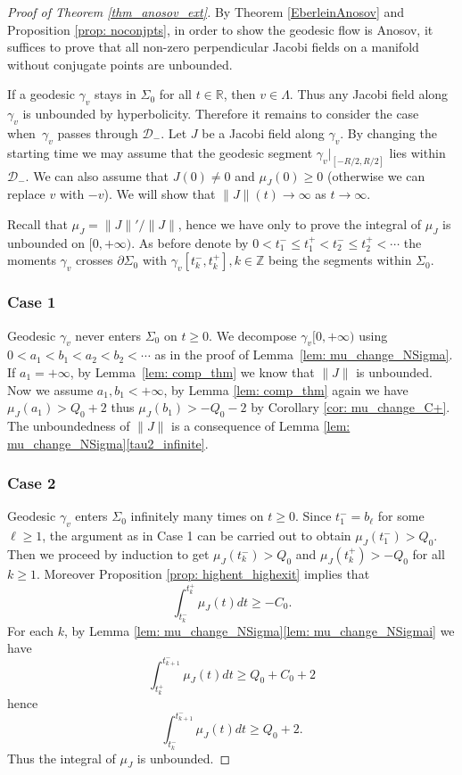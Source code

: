 \documentclass[JEP,XML,SOM,Unicode,NoFloatCountersInSection]{cedram}
\theoremstyle{definition}
\renewcommand{\>}{{\rangle}}
\newcommand{\<}{{\langle}}
\begin{document}
\begin{proof}[Proof of Theorem \ref{thm_anosov_ext}]

By Theorem \ref{EberleinAnosov} and Proposition \ref{prop: noconjpts}, in order to show the geodesic flow is Anosov, it suffices to prove that all non-zero perpendicular Jacobi fields on a manifold without conjugate points are unbounded.

If a geodesic $\gamma_v$ stays in $\Sigma_0$ for all $t\in\mathbb{R}$, then $v\in\Lambda$. Thus any Jacobi field along~$\gamma_v$ is unbounded by hyperbolicity. Therefore it remains to consider the case when~$\gamma_v$ passes through $\mathcal{D}_-$. Let $J$ be a Jacobi field along $\gamma_v$. By changing the starting time we may assume that the geodesic segment $\gamma_v|_{[-R/2,R/2]}$ lies within $\mathcal{D}_-$. We can also assume that $J(0)\neq 0$ and $\mu_J(0)\geq 0$ (otherwise we can replace $v$ with $-v$). We will show that $\|J\|(t)\to\infty$ as $t\to\infty$.

Recall that $\mu_J=\|J\|'/\|J\|$, hence we have only to prove the integral of $\mu_J$ is unbounded on $[0,+\infty)$.
As before denote by $0<t^-_1\leq t^+_1<t^-_2\leq t^+_2<\cdots$ the moments $\gamma_v$ crosses $\partial\Sigma_0$ with $\gamma_v[t^-_k, t^+_k], k\in\mathbb{Z}$ being the segments within $\Sigma_0$.

\subsubsection*{Case 1} Geodesic $\gamma_v$ never enters $\Sigma_0$ on $t\geq 0$. We decompose $\gamma_v[0,+\infty)$ using $0<a_1<b_1<a_2<b_2<\cdots$ as in the proof of Lemma~\ref{lem: mu_change_NSigma}. If $a_1=+\infty$, by Lemma~\ref{lem: comp_thm} we know that $\|J\|$ is unbounded. Now we assume $a_1,b_1<+\infty$, by Lemma \ref{lem: comp_thm} again we have $\mu_J(a_1)>Q_0+2$ thus $\mu_J(b_1)>-Q_0-2$ by Corollary \ref{cor: mu_change_C+}. The unboundedness of $\|J\|$ is a consequence of Lemma \ref{lem: mu_change_NSigma}\eqref{tau2_infinite}.

\subsubsection*{Case 2} Geodesic $\gamma_v$ enters $\Sigma_0$ infinitely many times on $t\geq 0$. Since $t^-_1=b_\ell$ for some $\ell\geq 1$, the argument as in Case 1 can be carried out to obtain $\mu_J(t^-_1)>Q_0$. Then we proceed by induction to get $\mu_J(t^-_k)>Q_0$ and $\mu_J(t^+_k)>-Q_0$ for all $k\geq 1$. Moreover Proposition \ref{prop: highent_highexit} implies that
\[
\int_{t^-_k}^{t^+_k}\mu_J(t)dt\geq -C_0.
\]
For each $k$, by Lemma \ref{lem: mu_change_NSigma}\eqref{lem: mu_change_NSigmai} we have
\[
\int_{t^+_k}^{t^-_{k+1}}\mu_J(t)dt\geq Q_0+C_0+2
\]
hence
\[
\int_{t^-_k}^{t^-_{k+1}}\mu_J(t)dt\geq Q_0+2.
\] Thus the integral of $\mu_J$ is unbounded.


\end{proof}
\end{document}
